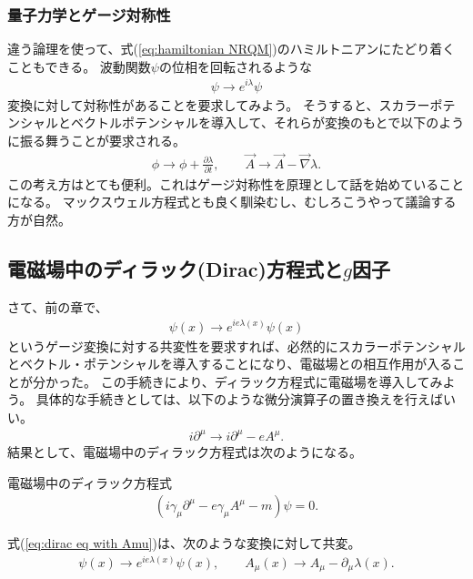 \documentclass[10pt,a4paper]{jarticle}
\begin{document}
\subsubsection{量子力学とゲージ対称性}
違う論理を使って、式(\ref{eq:hamiltonian NRQM})のハミルトニアンにたどり着くこともできる。
波動関数$\psi$の位相を回転されるような
\begin{align}
\psi \to e^{i\lambda} \psi
\end{align}
変換に対して対称性があることを要求してみよう。
そうすると、スカラーポテンシャルとベクトルポテンシャルを導入して、それらが変換のもとで以下のように振る舞うことが要求される。
\begin{align}
\phi \to \phi + \frac{\partial\lambda}{\partial t}, \qquad
\vec A \to \vec A - \vec\nabla \lambda.
\end{align}
この考え方はとても便利。これはゲージ対称性を原理として話を始めていることになる。
マックスウェル方程式とも良く馴染むし、むしろこうやって議論する方が自然。

\subsection{電磁場中のディラック(Dirac)方程式と$g$因子}
さて、前の章で、
\begin{align}
\psi(x) \to e^{ie\lambda(x) }\psi(x)
\end{align}
というゲージ変換に対する共変性を要求すれば、必然的にスカラーポテンシャルとベクトル・ポテンシャルを導入することになり、電磁場との相互作用が入ることが分かった。
この手続きにより、ディラック方程式に電磁場を導入してみよう。
具体的な手続きとしては、以下のような微分演算子の置き換えを行えばいい。
\begin{align}
i\partial^\mu \to i\partial^\mu - eA^\mu.
\end{align}
結果として、電磁場中のディラック方程式は次のようになる。

\begin{itembox}[l]{電磁場中のディラック方程式}
\begin{align}
(i\gamma_\mu \partial^\mu - e \gamma_\mu A^\mu - m)\psi = 0. \label{eq:dirac eq with Amu}
\end{align}
\end{itembox}
式(\ref{eq:dirac eq with Amu})は、次のような変換に対して共変。
\begin{align}
\psi(x) \to e^{ie\lambda(x)}\psi(x), \qquad
A_{\mu}(x) \to A_{\mu} - \partial_\mu \lambda(x).
\end{align}
\end{document}
